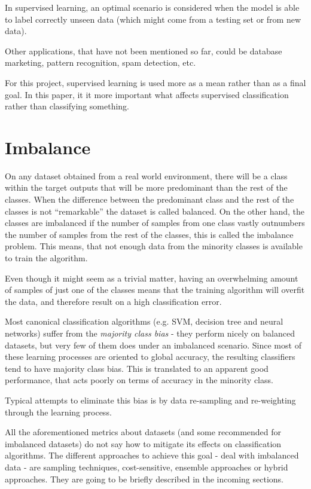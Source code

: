In supervised learning, an optimal scenario is considered when the model is able
to label correctly unseen data (which might come from a testing set or from new
data).

Other applications, that have not been mentioned so far, could be database 
marketing, pattern recognition, spam detection, etc.

For this project, supervised learning is used more as a mean rather than as a 
final goal. In this paper, it it more important what affects supervised 
classification rather than classifying something.

\section{Imbalance}
\label{sec:imbtechniques}

On any dataset obtained from a real world environment, there will be a class 
within the target outputs that will be more predominant than the rest of the 
classes. When the difference between the predominant class and the rest of the
classes is not ``remarkable'' the dataset is called balanced. On the other 
hand, the classes are imbalanced if the number of samples from one class vastly 
outnumbers the number of samples from the rest of the classes, this is called 
the imbalance problem. This means, that not enough data from the minority 
classes is available to train the algorithm.

Even though it might seem as a trivial matter, having an overwhelming 
amount of samples of just one of the classes means that the training algorithm 
will overfit the data, and therefore result on a high classification error.

Most canonical classification algorithms (e.g. SVM, decision tree and neural
networks) suffer from the \textit{majority class bias} - they perform nicely on 
balanced datasets, but very few of them does under an imbalanced scenario.
Since most of these learning processes are oriented to global accuracy, the
resulting classifiers tend to have majority class bias. This is translated to an
apparent good performance, that acts poorly on terms of accuracy in the minority
class.

Typical attempts to eliminate this bias is by data re-sampling and re-weighting 
through the learning process.

All the aforementioned metrics about datasets (and some recommended for 
imbalanced datasets) do not say how to mitigate its effects on classification 
algorithms. The different approaches to achieve this goal - deal with 
imbalanced data - are sampling techniques, cost-sensitive, ensemble approaches 
or hybrid approaches. They are going to be briefly described in the incoming 
sections.

